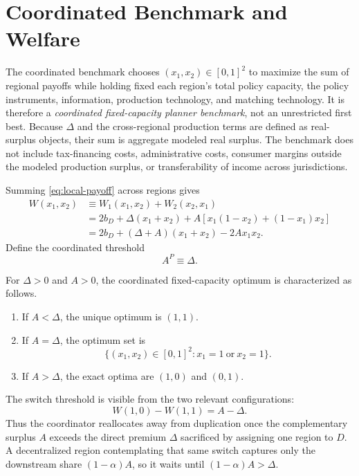 \section{Coordinated Benchmark and Welfare}
\label{sec:welfare}

The coordinated benchmark chooses $(x_1,x_2)\in[0,1]^2$ to maximize the sum of regional payoffs while holding fixed each region's total policy capacity, the policy instruments, information, production technology, and matching technology. It is therefore a \emph{coordinated fixed-capacity planner benchmark}, not an unrestricted first best. Because $\Delta$ and the cross-regional production terms are defined as real-surplus objects, their sum is aggregate modeled real surplus. The benchmark does not include tax-financing costs, administrative costs, consumer margins outside the modeled production surplus, or transferability of income across jurisdictions.

Summing \eqref{eq:local-payoff} across regions gives
\begin{align}
W(x_1,x_2)
&\equiv W_1(x_1,x_2)+W_2(x_2,x_1)\\
&=2b_D+\Delta(x_1+x_2)
+A\left[x_1(1-x_2)+(1-x_1)x_2\right]\\
&=2b_D+(\Delta+A)(x_1+x_2)-2Ax_1x_2.
\label{eq:aggregate-welfare}
\end{align}
Define the coordinated threshold
\begin{equation}
A^P\equiv \Delta.
\label{eq:AP}
\end{equation}

\begin{proposition}
\label{prop:planner}
For $\Delta>0$ and $A>0$, the coordinated fixed-capacity optimum is characterized as follows.
\begin{enumerate}
\item If $A<\Delta$, the unique optimum is $(1,1)$.
\item If $A=\Delta$, the optimum set is
\[
\{(x_1,x_2)\in[0,1]^2:x_1=1\ \text{or}\ x_2=1\}.
\]
\item If $A>\Delta$, the exact optima are $(1,0)$ and $(0,1)$.
\end{enumerate}
\end{proposition}

The switch threshold is visible from the two relevant configurations:
\[
W(1,0)-W(1,1)=A-\Delta.
\]
Thus the coordinator reallocates away from duplication once the complementary surplus $A$ exceeds the direct premium $\Delta$ sacrificed by assigning one region to $D$. A decentralized region contemplating that same switch captures only the downstream share $(1-\alpha)A$, so it waits until $(1-\alpha)A>\Delta$.

